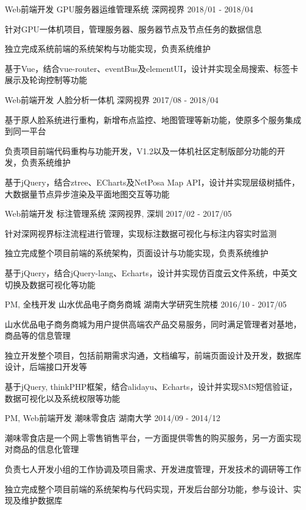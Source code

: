 \begin{cventries}
  \cventry
    {Web前端开发}
    {GPU服务器运维管理系统}
    {深网视界}
    {2018/01 - 2018/04}
    {
      \begin{cvitems}
        \item {针对GPU一体机项目，管理服务器、服务器节点及节点任务的数据信息}
        \item {独立完成系统前端的系统架构与功能实现，负责系统维护}
        \item {基于Vue，结合vue-router、eventBus及elementUI，设计并实现全局搜索、标签卡展示及轮询控制等功能}
      \end{cvitems}
    }
  \cventry
    {Web前端开发}
    {人脸分析一体机}
    {深网视界}
    {2017/08 - 2018/04}
    {
      \begin{cvitems}
        \item {基于原人脸系统进行重构，新增布点监控、地图管理等新功能，使原多个服务集成到同一平台}
        \item {负责项目前端代码重构与功能开发，V1.2以及一体机社区定制版部分功能的开发，负责系统维护}
        \item {基于jQuery，结合ztree、ECharts及NetPosa Map API，设计并实现层级树插件，大数据量节点异步渲染及平面地图交互等功能}
      \end{cvitems}
    }
  \cventry
    {Web前端开发}
    {标注管理系统}
    {深网视界, 深圳}
    {2017/02 - 2017/05}
    {
      \begin{cvitems}
        \item {针对深网视界标注流程进行管理，实现标注数据可视化与标注内容实时监测}
        \item {独立完成整个项目前端的系统架构，页面设计与功能实现，负责系统维护}
        \item {基于jQuery，结合jQuery-lang、Echarts，设计并实现仿百度云文件系统，中英文切换及数据可视化等功能}
      \end{cvitems}
    }
  \cventry
    {PM, 全栈开发}
    {山水优品电子商务商城}
    {湖南大学研究生院楼}
    {2016/10 - 2017/05}
    {
      \begin{cvitems}
        \item {山水优品电子商务商城为用户提供高端农产品交易服务，同时满足管理者对基地，商品等的信息管理}
        \item {独立开发整个项目，包括前期需求沟通，文档编写，前端页面设计及开发，数据库设计，后端接口开发等}
        \item {基于jQuery, thinkPHP框架，结合alidayu、Echarts，设计并实现SMS短信验证，数据可视化以及系统权限等功能}
      \end{cvitems}
    }
  \cventry
    {PM, Web前端开发}
    {潮味零食店}
    {湖南大学}
    {2014/09 - 2014/12}
    {
      \begin{cvitems}
        \item {潮味零食店是一个网上零售销售平台，一方面提供零售的购买服务，另一方面实现对商品的信息化管理}
        \item {负责七人开发小组的工作协调及项目需求、开发进度管理，开发技术的调研等工作}
        \item {独立完成整个项目前端的系统架构与代码实现，开发后台部分功能，参与设计、实现及维护数据库}
      \end{cvitems}
    }
\end{cventries}
